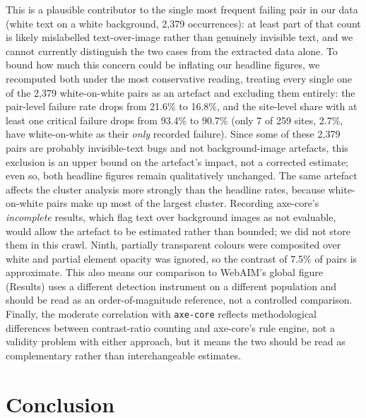 \documentclass[10pt]{article}
\begin{document}
This is a plausible contributor to the single most frequent failing pair in our data (white text on a white background, 2{,}379 occurrences): at least part of that count is likely mislabelled text-over-image rather than genuinely invisible text, and we cannot currently distinguish the two cases from the extracted data alone. To bound how much this concern could be inflating our headline figures, we recomputed both under the most conservative reading, treating every single one of the 2{,}379 white-on-white pairs as an artefact and excluding them entirely: the pair-level failure rate drops from 21.6\% to 16.8\%, and the site-level share with at least one critical failure drops from 93.4\% to 90.7\% (only 7 of 259 sites, 2.7\%, have white-on-white as their \emph{only} recorded failure). Since some of these 2{,}379 pairs are probably invisible-text bugs and not background-image artefacts, this exclusion is an upper bound on the artefact's impact, not a corrected estimate; even so, both headline figures remain qualitatively unchanged. The same artefact affects the cluster analysis more strongly than the headline rates, because white-on-white pairs make up most of the largest cluster. Recording axe-core's \emph{incomplete} results, which flag text over background images as not evaluable, would allow the artefact to be estimated rather than bounded; we did not store them in this crawl. Ninth, partially transparent colours were composited over white and partial element opacity was ignored, so the contrast of 7.5\% of pairs is approximate. This also means our comparison to WebAIM's global figure (Results) uses a different detection instrument on a different population and should be read as an order-of-magnitude reference, not a controlled comparison. Finally, the moderate correlation with \texttt{axe-core} reflects methodological differences between contrast-ratio counting and axe-core's rule engine, not a validity problem with either approach, but it means the two should be read as complementary rather than interchangeable estimates.

\section{Conclusion}
\end{document}
